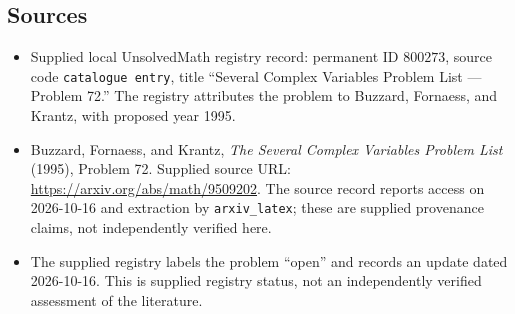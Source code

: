 \documentclass[11pt]{article}
\begin{document}
\subsection{Sources}
\begin{itemize}
\item Supplied local UnsolvedMath registry record: permanent ID \(800273\), source code \texttt{catalogue entry}, title ``Several Complex Variables Problem List --- Problem 72.'' The registry attributes the problem to Buzzard, Fornaess, and Krantz, with proposed year 1995.
\item Buzzard, Fornaess, and Krantz, \emph{The Several Complex Variables Problem List} (1995), Problem 72. Supplied source URL: \url{https://arxiv.org/abs/math/9509202}. The source record reports access on 2026-10-16 and extraction by \texttt{arxiv\_latex}; these are supplied provenance claims, not independently verified here.
\item The supplied registry labels the problem ``open'' and records an update dated 2026-10-16. This is supplied registry status, not an independently verified assessment of the literature.
\end{itemize}
\end{document}
